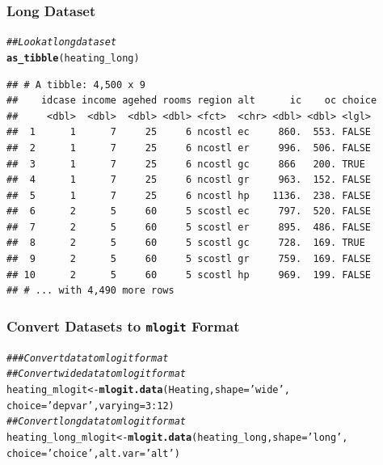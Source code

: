 \documentclass{beamer}\usepackage[]{graphicx}\usepackage[]{color}
\makeatletter
\newcommand{\hlnum}[1]{\textcolor[rgb]{0.686,0.059,0.569}{#1}}%
\newcommand{\hlstr}[1]{\textcolor[rgb]{0.192,0.494,0.8}{#1}}%
\newcommand{\hlcom}[1]{\textcolor[rgb]{0.678,0.584,0.686}{\textit{#1}}}%
\newcommand{\hlopt}[1]{\textcolor[rgb]{0,0,0}{#1}}%
\newcommand{\hlstd}[1]{\textcolor[rgb]{0.345,0.345,0.345}{#1}}%
\newcommand{\hlkwb}[1]{\textcolor[rgb]{0.69,0.353,0.396}{#1}}%
\newcommand{\hlkwc}[1]{\textcolor[rgb]{0.333,0.667,0.333}{#1}}%
\newcommand{\hlkwd}[1]{\textcolor[rgb]{0.737,0.353,0.396}{\textbf{#1}}}%
\newenvironment{kframe}{%
 \def\at@end@of@kframe{}%
 \ifinner\ifhmode%
  \def\at@end@of@kframe{\end{minipage}}%
  \begin{minipage}{\columnwidth}%
 \fi\fi%
 \def\FrameCommand##1{\hskip\@totalleftmargin \hskip-\fboxsep
 \colorbox{shadecolor}{##1}\hskip-\fboxsep
     \hskip-\linewidth \hskip-\@totalleftmargin \hskip\columnwidth}%
 \MakeFramed {\advance\hsize-\width
   \@totalleftmargin\z@ \linewidth\hsize
   \@setminipage}}%
 {\par\unskip\endMakeFramed%
 \at@end@of@kframe}
\newenvironment{knitrout}{}{} %
\makeatother
\begin{document}
\begin{frame}[fragile]\frametitle{Long Dataset}
\begin{knitrout}\footnotesize
{}\color{fgcolor}\begin{kframe}
\begin{alltt}
\hlcom{## Look at long dataset}
\hlkwd{as_tibble}\hlstd{(heating_long)}
\end{alltt}
\begin{verbatim}
## # A tibble: 4,500 x 9
##    idcase income agehed rooms region alt      ic    oc choice
##     <dbl>  <dbl>  <dbl> <dbl> <fct>  <chr> <dbl> <dbl> <lgl> 
##  1      1      7     25     6 ncostl ec     860.  553. FALSE 
##  2      1      7     25     6 ncostl er     996.  506. FALSE 
##  3      1      7     25     6 ncostl gc     866   200. TRUE  
##  4      1      7     25     6 ncostl gr     963.  152. FALSE 
##  5      1      7     25     6 ncostl hp    1136.  238. FALSE 
##  6      2      5     60     5 scostl ec     797.  520. FALSE 
##  7      2      5     60     5 scostl er     895.  486. FALSE 
##  8      2      5     60     5 scostl gc     728.  169. TRUE  
##  9      2      5     60     5 scostl gr     759.  169. FALSE 
## 10      2      5     60     5 scostl hp     969.  199. FALSE 
## # ... with 4,490 more rows
\end{verbatim}
\end{kframe}
\end{knitrout}
\end{frame}

\begin{frame}[fragile]\frametitle{Convert Datasets to \texttt{mlogit} Format}
\begin{knitrout}\footnotesize
{}\color{fgcolor}\begin{kframe}
\begin{alltt}
\hlcom{### Convert data to mlogit format}
\hlcom{## Convert wide data to mlogit format}
\hlstd{heating_mlogit} \hlkwb{<-} \hlkwd{mlogit.data}\hlstd{(Heating,} \hlkwc{shape} \hlstd{=} \hlstr{'wide'}\hlstd{,}
                              \hlkwc{choice} \hlstd{=} \hlstr{'depvar'}\hlstd{,} \hlkwc{varying} \hlstd{=} \hlnum{3}\hlopt{:}\hlnum{12}\hlstd{)}
\hlcom{## Convert long data to mlogit format}
\hlstd{heating_long_mlogit} \hlkwb{<-} \hlkwd{mlogit.data}\hlstd{(heating_long,} \hlkwc{shape} \hlstd{=} \hlstr{'long'}\hlstd{,}
                                   \hlkwc{choice} \hlstd{=} \hlstr{'choice'}\hlstd{,} \hlkwc{alt.var} \hlstd{=} \hlstr{'alt'}\hlstd{)}
\end{alltt}
\end{kframe}
\end{knitrout}
\end{frame}
\end{document}
